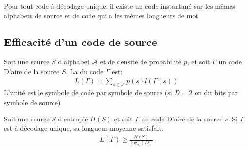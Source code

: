 \documentclass[a4paper]{article}
\begin{document}
\begin{theoreme}
Pour tout code à décodage unique, il existe un code instantané sur les mêmes alphabets de source et de code qui a les mêmes longueurs de mot
\end{theoreme}
\subsection{Efficacité d'un code de source}
\begin{definition}
Soit une source $S$ d'alphabet $\mathcal{A}$ et de densité de probabilité $p$, et soit $\Gamma$ un code D'aire de la source $S$. La  du code $\Gamma$ est:
\begin{align*} 
    L\left(\Gamma\right) = \sum_{s \in \mathcal{A}}p\left(s\right)l\left(\Gamma \left(s\right)\right)  
\end{align*}
L'unité est le symbole de code par symbole de source (si $D = 2$ on dit bits par symbole de source)
\end{definition} 
\begin{theoreme}
Soit une source $S$ d'entropie $H\left(S\right)$ et soit $\Gamma$ un code D'aire de la source $s$. Si $\Gamma$ est à décodage unique, sa longueur moyenne satisfait:
\begin{align*} L\left(\Gamma\right) \geq \frac{H\left(S\right)}{\log_2 \left(D\right)} \end{align*}
\end{theoreme}
\end{document}
